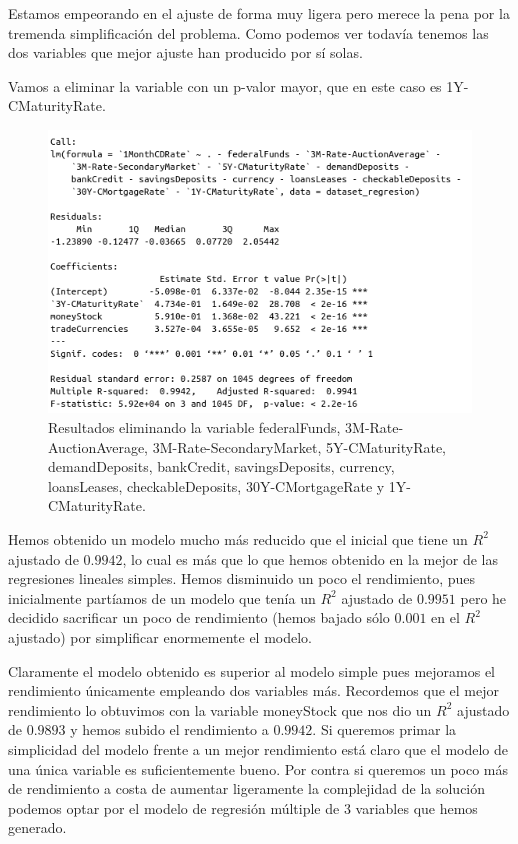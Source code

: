 \documentclass[12pt,a4paper]{article}
\begin{document}
Estamos empeorando en el ajuste de forma muy ligera pero merece la pena por la tremenda simplificación del problema. Como podemos ver todavía tenemos las dos variables que mejor ajuste han producido por sí solas.

Vamos a eliminar la variable con un p-valor mayor, que en este caso es 1Y-CMaturityRate.

\begin{figure}[H]
	\centering 
	\includegraphics[scale=0.6]{./Imagenes/Regresion/regresion_multiple13.png}
	\caption{Resultados eliminando la variable federalFunds, 3M-Rate-AuctionAverage, 3M-Rate-SecondaryMarket, 5Y-CMaturityRate, demandDeposits, bankCredit, savingsDeposits, currency, loansLeases, checkableDeposits, 30Y-CMortgageRate y 1Y-CMaturityRate.}
\end{figure}

Hemos obtenido un modelo mucho más reducido que el inicial que tiene un $R^2$ ajustado de $0.9942$, lo cual es más que lo que hemos obtenido en la mejor de las regresiones lineales simples. Hemos disminuido un poco el rendimiento, pues inicialmente partíamos de un modelo que tenía un $R^2$ ajustado de $0.9951$ pero he decidido sacrificar un poco de rendimiento (hemos bajado sólo $0.001$ en el $R^2$ ajustado) por simplificar enormemente el modelo.

Claramente el modelo obtenido es superior al modelo simple pues mejoramos el rendimiento únicamente empleando dos variables más. Recordemos que el mejor rendimiento lo obtuvimos con la variable moneyStock que nos dio un $R^2$ ajustado de $0.9893$ y hemos subido el rendimiento a $0.9942$. Si queremos primar la simplicidad del modelo frente a un mejor rendimiento está claro que el modelo de una única variable es suficientemente bueno. Por contra si queremos un poco más de rendimiento a costa de aumentar ligeramente la complejidad de la solución podemos optar por el modelo de regresión múltiple de 3 variables que hemos generado.
\end{document}
